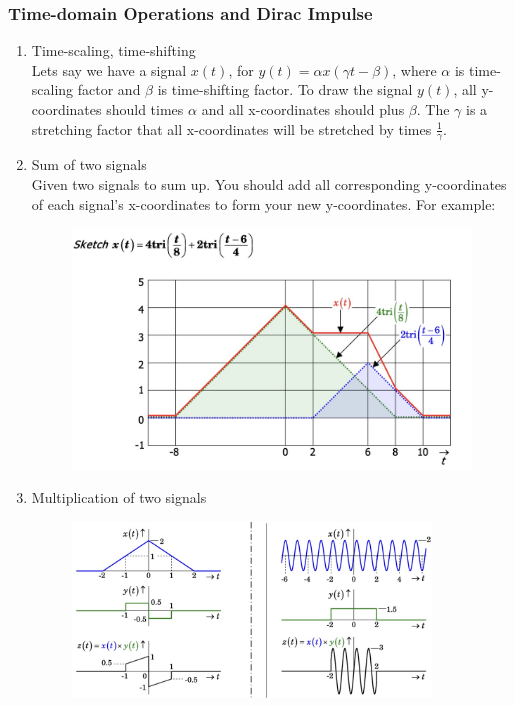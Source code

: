 \subsubsection{Time-domain Operations and Dirac Impulse}
\begin{enumerate}
    \item Time-scaling, time-shifting \\
    Lets say we have a signal $x(t)$, for $y(t) = \alpha x(\gamma t - \beta)$, where $\alpha$ is time-scaling factor and $\beta$ is time-shifting factor. To draw the signal $y(t)$, all y-coordinates should times $\alpha$ and all x-coordinates should plus $\beta$. The $\gamma$ is a stretching factor that all x-coordinates will be stretched by times $\frac{1}{\gamma}$.  
    \item Sum of two signals \\
    Given two signals to sum up. You should add all corresponding y-coordinates of each signal's 
    x-coordinates to form your new y-coordinates. 
    \newpage
    For example:
    \begin{figure}[h]
        \centering
        \includegraphics[width=1\textwidth]{image/triangle_add_example.jpg}
        \label{fig:enter-label}
    \end{figure}
    \item Multiplication of two signals
    \begin{figure}[h]
        \centering
        \includegraphics[width=0.9\textwidth]{image/mutiplication.jpg}

\end{figure}
\end{enumerate}
